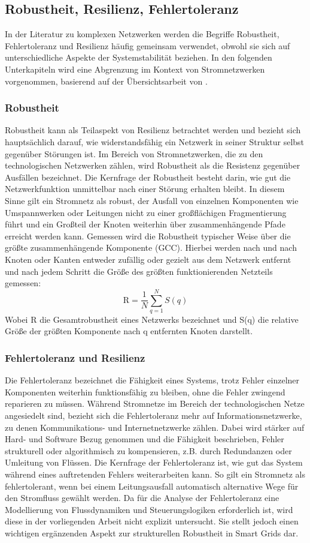\subsection{Robustheit, Resilienz, Fehlertoleranz}
In der Literatur zu komplexen Netzwerken werden die Begriffe Robustheit, Fehlertoleranz und Resilienz häufig gemeinsam verwendet, obwohl sie sich auf unterschiedliche Aspekte der Systemstabilität beziehen. In den folgenden Unterkapiteln wird eine Abgrenzung im Kontext von Stromnetzwerken vorgenommen, basierend auf der Übersichtsarbeit von \cite{Qi2024}. 
\subsubsection{Robustheit}
Robustheit kann als Teilaspekt von Resilienz betrachtet werden  und bezieht sich hauptsächlich darauf, wie widerstandsfähig ein Netzwerk in seiner Struktur selbst gegenüber Störungen ist. Im Bereich von Stromnetzwerken, die zu den technologischen Netzwerken zählen, wird Robustheit als die Resistenz gegenüber Ausfällen bezeichnet. Die Kernfrage der Robustheit besteht darin, wie gut die Netzwerkfunktion unmittelbar nach einer Störung erhalten bleibt. In diesem Sinne gilt ein Stromnetz als robust, der Ausfall von einzelnen Komponenten wie Umspannwerken oder Leitungen nicht zu einer großflächigen Fragmentierung führt und ein Großteil der Knoten weiterhin über zusammenhängende Pfade erreicht werden kann. 
Gemessen wird die Robustheit typischer Weise über die größte zusammenhängende Komponente (GCC). Hierbei werden nach und nach Knoten oder Kanten entweder zufällig oder gezielt aus dem Netzwerk entfernt und nach jedem Schritt die Größe des größten funktionierenden Netzteils gemessen: 
\[
\mathrm{R} = \frac{1}{N} \sum_{q=1}^{N} S(q)
\]
Wobei R die Gesamtrobustheit eines Netzwerks bezeichnet und S(q) die relative Größe der größten Komponente nach q entfernten Knoten darstellt. 

\subsubsection{Fehlertoleranz und Resilienz}
Die Fehlertoleranz bezeichnet die Fähigkeit eines Systems, trotz Fehler einzelner Komponenten weiterhin funktionsfähig zu bleiben, ohne die Fehler zwingend reparieren zu müssen. Während Stromnetze im Bereich der technologischen Netze angesiedelt sind, bezieht sich die Fehlertoleranz mehr auf Informationsnetzwerke, zu denen Kommunikations- und Internetnetzwerke zählen. Dabei wird stärker auf Hard- und Software Bezug genommen und die Fähigkeit beschrieben, Fehler strukturell oder algorithmisch zu kompensieren, z.B. durch Redundanzen oder Umleitung von Flüssen. Die Kernfrage der Fehlertoleranz ist, wie gut das System während eines auftretenden Fehlers weiterarbeiten kann. So gilt ein Stromnetz als fehlertolerant, wenn bei einem Leitungsausfall automatisch alternative Wege für den Stromfluss gewählt werden. 
Da für die Analyse der Fehlertoleranz eine Modellierung von Flussdynamiken und Steuerungslogiken erforderlich ist, wird diese in der vorliegenden Arbeit nicht explizit untersucht. Sie stellt jedoch einen wichtigen ergänzenden Aspekt zur strukturellen Robustheit in Smart Grids dar. 

